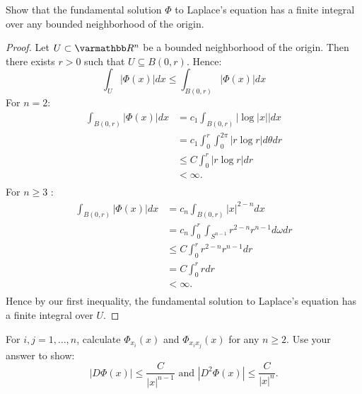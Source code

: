 \documentclass[10pt,oneside,openany]{memoir}
\begin{document}
\newpage
\begin{exercise}
	Show that the fundamental solution $\Phi$ to Laplace's equation has a finite integral over any bounded neighborhood of the origin.
\end{exercise}
	\begin{proof}
		Let $U \subset \bfR^n$ be a bounded neighborhood of the origin. Then there exists $r > 0$ such that $U \subseteq B(0,r)$. Hence:
		\[
			\int_{U}^{} \left| \Phi(x) \right| dx \leq \int_{B(0,r)}^{} \left| \Phi(x) \right| dx
		\]
		For $n=2$:
		\begin{align*}
			\int_{B(0,r)}^{} \left| \Phi(x) \right| dx
			&= c_1 \int_{B(0,r)}^{} |\log|x||dx \\
			&= c_1 \int_{0}^{r} \int_{0}^{2\pi} |r \log r|d \theta dr \\
			& \leq C \int_{0}^{r} |r \log r|dr \\
			&< \infty. \\
		\end{align*}
		For $n \geq 3$ :
		\begin{align*}
			\int_{B(0,r)}^{} \left| \Phi(x) \right| dx
			&= c_n \int_{B(0,r)}^{} |x|^{2-n}dx \\
			&= c_n \int_{0}^{r} \int_{S^{n-1}}^{} r^{2-n}r^{n-1}d \omega dr\\
			&\leq C \int_{0}^{r} r^{2-n}r^{n-1}dr \\
			&= C \int_{0}^{r} r dr\\
			&< \infty.  \\
		\end{align*}
		Hence by our first inequality, the fundamental solution to Laplace's equation has a finite integral over $U$.
	\end{proof}
\begin{exercise}
	For $i,j = 1,\ldots,n$, calculate $\Phi_{x_i}(x)$ and $\Phi_{x_i x_j}(x)$ for any $n\geq 2$. Use your answer to show:
	\[
		|D \Phi(x)| \leq \frac{C}{|x|^{n-1}} \text{ and } |D^2 \Phi(x)|\leq \frac{C}{|x|^n}.
	\] 
\end{exercise}
\end{document}
